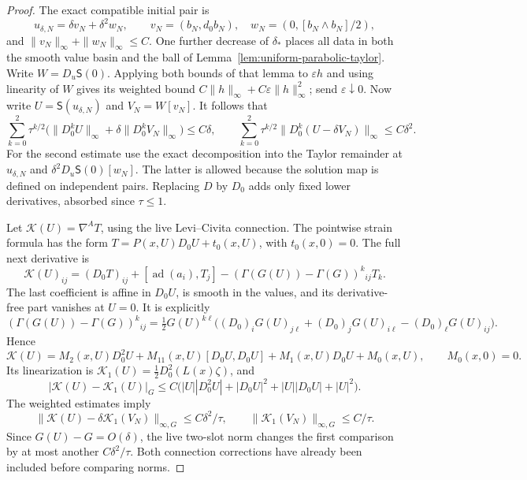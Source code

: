 \documentclass[11pt]{article}
\numberwithin{equation}{section}
\theoremstyle{definition}
\theoremstyle{remark}
\begin{document}
\begin{proof}
The exact compatible initial pair is
\[
 u_{\delta,N}=\delta v_N+\delta^2w_N,\qquad
 v_N=(b_N,d_0b_N),\quad
 w_N=(0,[b_N\wedge b_N]/2),
\]
and \(\|v_N\|_\infty+\|w_N\|_\infty\le C\).
One further decrease of \(\delta_*\) places all data in
both the smooth value basin and the ball of
Lemma~\ref{lem:uniform-parabolic-taylor}.
Write \(W=D_u\mathsf S(0)\). Applying both bounds of that
lemma to \(\varepsilon h\) and using linearity of \(W\)
gives its weighted bound
\(C\|h\|_\infty+C\varepsilon\|h\|_\infty^2\); send
\(\varepsilon\downarrow0\).
Now write \(U=\mathsf S(u_{\delta,N})\) and \(V_N=W[v_N]\).
It follows that
\[
 \sum_{k=0}^2\tau^{k/2}
 \bigl(\|D_0^kU\|_\infty+
       \delta\|D_0^kV_N\|_\infty\bigr)\le C\delta,\qquad
 \sum_{k=0}^2\tau^{k/2}
       \|D_0^k(U-\delta V_N)\|_\infty\le C\delta^2 .
\]
For the second estimate use the exact decomposition into
the Taylor remainder at \(u_{\delta,N}\) and
\(\delta^2D_u\mathsf S(0)[w_N]\).
The latter is allowed because the solution map is defined
on independent pairs. Replacing \(D\) by \(D_0\) adds only
fixed lower derivatives, absorbed since \(\tau\le1\).

Let \(\mathcal K(U)=\nabla^AT\), using the live
Levi--Civita connection. The pointwise strain formula has
the form \(T=P(x,U)D_0U+t_0(x,U)\), with \(t_0(x,0)=0\).
The full next derivative is
\[
 \mathcal K(U)_{ij}
 =(D_0T)_{ij}+[\operatorname{ad}(a_i),T_j]
       -(\Gamma(G(U))-\Gamma(G))^k{}_{ij}T_k .
\]
The last coefficient is affine in \(D_0U\), is smooth in
the values, and its derivative-free part vanishes at \(U=0\).
It is explicitly
\[
 (\Gamma(G(U))-\Gamma(G))^k{}_{ij}
 =\tfrac12G(U)^{k\ell}
  \bigl((D_0)_iG(U)_{j\ell}+(D_0)_jG(U)_{i\ell}
                          -(D_0)_\ell G(U)_{ij}\bigr).
\]
Hence
\[
 \mathcal K(U)=M_2(x,U)D_0^2U+
 M_{11}(x,U)[D_0U,D_0U]+M_1(x,U)D_0U+M_0(x,U),
 \qquad M_0(x,0)=0 .
\]
Its linearization is
\(\mathcal K_1(U)=\tfrac12D_0^2(L(x)\zeta)\), and
\[
 |\mathcal K(U)-\mathcal K_1(U)|_G
 \le C\bigl(|U||D_0^2U|+|D_0U|^2
                 +|U||D_0U|+|U|^2\bigr).
\]
The weighted estimates imply
\[
 \|\mathcal K(U)-\delta\mathcal K_1(V_N)\|_{\infty,G}
       \le C\delta^2/\tau,\qquad
 \|\mathcal K_1(V_N)\|_{\infty,G}\le C/\tau .
\]
Since \(G(U)-G=O(\delta)\), the live two-slot norm
changes the first comparison by at most another
\(C\delta^2/\tau\). Both connection corrections have
already been included before comparing norms.


\end{proof}
\end{document}
